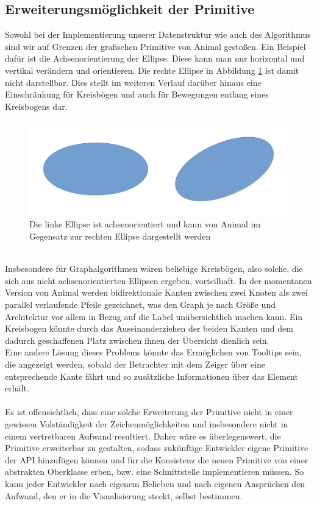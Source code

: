 \documentclass[nochapname]{tudexercise}
\begin{document}
		\subsection{Erweiterungsmöglichkeit der Primitive}
			Sowohl bei der Implementierung unserer Datenstruktur wie auch des Algorithmus sind wir auf Grenzen der grafischen Primitive von Animal gestoßen. Ein Beispiel dafür ist die Achsenorientierung der Ellipse. Diese kann man nur horizontal und vertikal verändern und orientieren. Die rechte Ellipse in Abbildung \ref{fig:ellipse} ist damit nicht darstellbar. Dies stellt im weiteren Verlauf darüber hinaus eine Einschränkung für Kreisbögen und auch für Bewegungen entlang eines Kreisbogens dar.
			\begin{figure}[h]
				\centering
				\includegraphics[scale=0.3]{ellipse.png}
				\caption{Die linke Ellipse ist achsenorientiert und kann von Animal im Gegensatz zur rechten Ellipse dargestellt werden}
				\label{fig:ellipse}
			\end{figure}\\
			Insbesondere für Graphalgorithmen wären beliebige Kreisbögen, also solche, die sich aus nicht achsenorientierten Ellipsen ergeben, vorteilhaft. In der momentanen Version von Animal werden bidirektionale Kanten zwischen zwei Knoten als zwei parallel verlaufende Pfeile gezeichnet, was den Graph je nach Größe und Architektur vor allem in Bezug auf die Label unübersichtlich machen kann. Ein Kreisbogen könnte durch das Auseinanderziehen der beiden Kanten und dem dadurch geschaffenen Platz zwischen ihnen der Übersicht dienlich sein.\\
			Eine andere Lösung dieses Problems könnte das Ermöglichen von Tooltips sein, die angezeigt werden, sobald der Betrachter mit dem Zeiger über eine entsprechende Kante fährt und so zusätzliche Informationen über das Element erhält.\\\\
			Es ist offensichtlich, dass eine solche Erweiterung der Primitive nicht in einer gewissen Volständigkeit der Zeichenmöglichkeiten und insbesondere nicht in einem vertretbaren Aufwand resultiert. Daher wäre es überlegenswert, die Primitive erweiterbar zu gestalten, sodass zukünftige Entwickler eigene Primitive der API hinzufügen können und für die Konsistenz die neuen Primitive von einer abstrakten Oberklasse erben, bzw. eine Schnittstelle implementieren müssen. So kann jeder Entwickler nach eigenem Belieben und nach eigenen Ansprüchen den Aufwand, den er in die Visualisierung steckt, selbst bestimmen.
		
\end{document}
